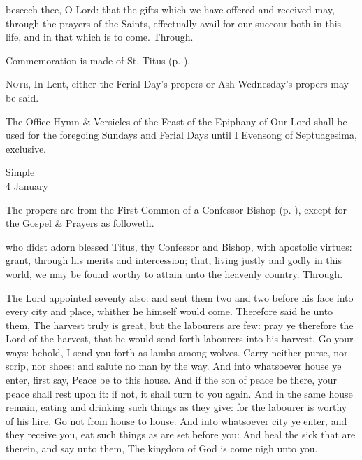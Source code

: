 \postcommunion
{} beseech thee, O Lord: that the gifts which we have offered and received may, through the prayers of the Saints, effectually avail for our succour both in this life, and in that which is to come. Through.

\begin{rubric}
	Commemoration is made of St. Titus (p. \pageref{TitusPostcommunion}).
\end{rubric}

\begin{rubric}
	\textsc{Note,} In Lent, either the Ferial Day's propers or Ash Wednesday's propers may be said.
\end{rubric}

\begin{rubric}
	The Office Hymn \& Versicles of the Feast of the Epiphany of Our Lord shall be used for the foregoing Sundays and Ferial Days until I Evensong of Septuagesima, exclusive.
\end{rubric}


\label{Titus}
\begin{inhead}
    {Simple\\
4 January}
\end{inhead}

\begin{rubric}
	The propers are from the First Common of a Confessor Bishop (p. \pageref{CommonConfessorBishopI}), except for the Gospel \& Prayers as followeth.
\end{rubric}

\collect\label{TitusCollect}
 who didst adorn blessed Titus, thy Confessor and Bishop, with apostolic virtues: grant, through his merits and intercession; that, living justly and godly in this world, we may be found worthy to attain unto the heavenly country. Through.

 The Lord appointed seventy also: and sent them two and two before his face into every city and place, whither he himself would come. Therefore said he unto them, The harvest truly is great, but the labourers are few: pray ye therefore the Lord of the harvest, that he would send forth labourers into his harvest. Go your ways: behold, I send you forth as lambs among wolves. Carry neither purse, nor scrip, nor shoes: and salute no man by the way. And into whatsoever house ye enter, first say, Peace be to this house. And if the son of peace be there, your peace shall rest upon it: if not, it shall turn to you again. And in the same house remain, eating and drinking such things as they give: for the labourer is worthy of his hire. Go not from house to house. And into whatsoever city ye enter, and they receive you, eat such things as are set before you: And heal the sick that are therein, and say unto them, The kingdom of God is come nigh unto you.

